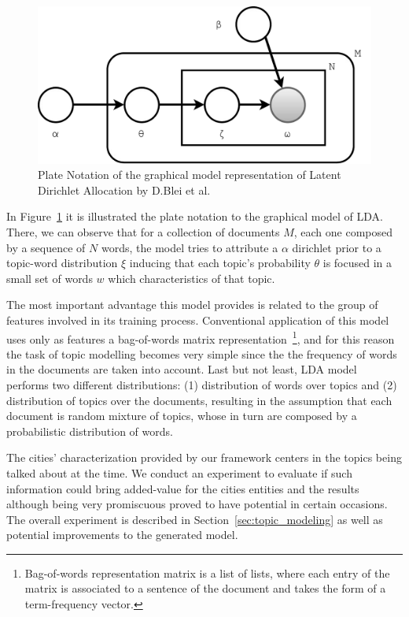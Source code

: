 \begin{figure}[htbp]
	\centering
	\includegraphics[scale=0.41, keepaspectratio]{figures/lda-model.pdf}
	\caption{Plate Notation of the graphical model representation of Latent Dirichlet Allocation by D.Blei et al. ~\cite{blei2003latent}}
	\label{fig:lda_graphical_model_representation}
\end{figure}

In Figure~\ref{fig:lda_graphical_model_representation} it is illustrated the plate notation to the graphical model of LDA. There, we can observe that for a collection of documents $M$, each one composed by a sequence of $N$ words, the model tries to attribute a $\alpha$ dirichlet prior to a topic-word distribution $\xi$ inducing that each topic's probability $\theta$ is focused in a small set of words $w$ which characteristics of that topic.

The most important advantage this model provides is related to the group of features involved in its training process. Conventional application of this model uses only as features a bag-of-words matrix representation~\footnote{Bag-of-words representation matrix is a list of lists, where each entry of the matrix is associated to a sentence of the document and takes the form of a term-frequency vector.}, and for this reason the task of topic modelling becomes very simple since the the frequency of words in the documents are taken into account. Last but not least, LDA model performs two different distributions: (1) distribution of words over topics and (2) distribution of topics over the documents, resulting in the assumption that each document is random mixture of topics, whose in turn are composed by a probabilistic distribution of words.

The cities' characterization provided by our framework centers in the topics being talked about at the time. We conduct an experiment to evaluate if such information could bring added-value for the cities entities and the results although being very promiscuous proved to have potential in certain occasions. The overall experiment is described in Section~\ref{sec:topic_modeling} as well as potential improvements to the generated model.

